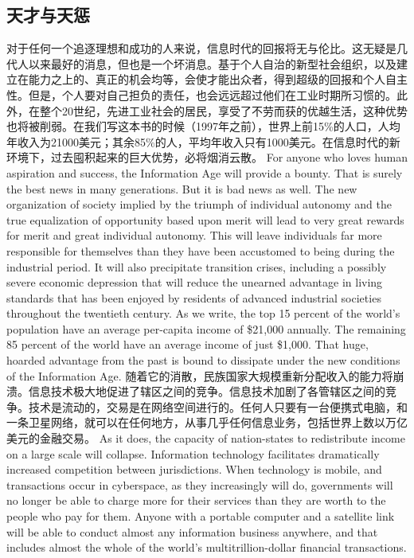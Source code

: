\subsection{天才与天惩}
\begin{paracol}{2}[]
对于任何一个追逐理想和成功的人来说，信息时代的回报将无与伦比。这无疑是几代人以来最好的消息，但也是一个坏消息。基于个人自治的新型社会组织，以及建立在能力之上的、真正的机会均等，会使才能出众者，得到超级的回报和个人自主性。但是，个人要对自己担负的责任，也会远远超过他们在工业时期所习惯的。此外，在整个20世纪，先进工业社会的居民，享受了不劳而获的优越生活，这种优势也将被削弱。在我们写这本书的时候（1997年之前），世界上前15\%的人口，人均年收入为21000美元；其余85\%的人，平均年收入只有1000美元。在信息时代的新环境下，过去囤积起来的巨大优势，必将烟消云散。
\switchcolumn
For anyone who loves human aspiration and success, the Information Age will provide a bounty. That is surely the best news in many generations. But it is bad news as well. The new organization of society implied by the triumph of individual autonomy and the true equalization of opportunity based upon merit will lead to very great rewards for merit and great individual autonomy. This will leave individuals far more responsible for themselves than they have been accustomed to being during the industrial period. It will also precipitate transition crises, including a possibly severe economic depression that will reduce the unearned advantage in living standards that has been enjoyed by residents of advanced industrial societies throughout the twentieth century.  As we write, the top 15 percent of the world's population have an average per-capita income of \$21,000 annually. The remaining 85 percent of the world have an average income of just \$1,000. That huge, hoarded advantage from the past is bound to dissipate under the new conditions of the Information Age. 
\switchcolumn*
随着它的消散，民族国家大规模重新分配收入的能力将崩溃。信息技术极大地促进了辖区之间的竞争。信息技术加剧了各管辖区之间的竞争。技术是流动的，交易是在网络空间进行的。任何人只要有一台便携式电脑，和一条卫星网络，就可以在任何地方，从事几乎任何信息业务，包括世界上数以万亿美元的金融交易。 
\switchcolumn
As it does, the capacity of nation-states to redistribute income on a large scale will collapse. Information technology facilitates dramatically increased competition between jurisdictions. When technology is mobile, and transactions occur in cyberspace, as they increasingly will do, governments will no longer be able to charge more for their services than they are worth to the people who pay for them. Anyone with a portable computer and a satellite link will be able to conduct almost any information business anywhere, and that includes almost the whole of the world's multitrillion-dollar financial transactions.

\end{paracol}
